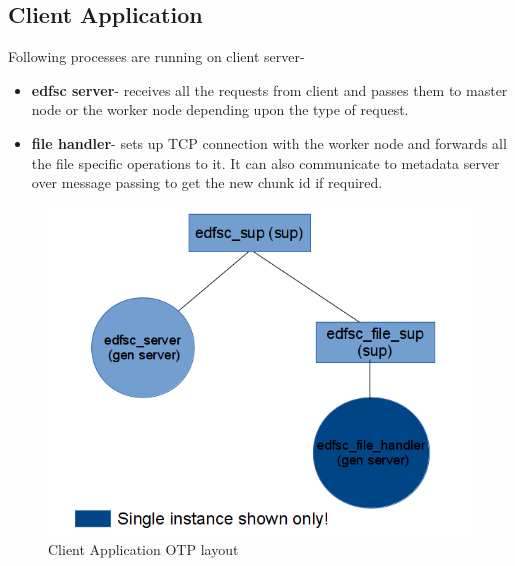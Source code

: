 \documentclass[a4paper,12pt]{article}
\begin{document}
\subsection{Client Application}
Following processes are running on client server-
\begin{itemize}
\item \textbf{edfsc server}- receives all the requests from client and passes them to master node or the worker node depending upon the type of request.
\item \textbf{file handler}- sets up TCP connection with the worker node and forwards all the file specific operations to it. It can also communicate to metadata server over message passing to get the new chunk id if required.
\end{itemize}
\begin{figure}[h]
  \begin{center}
    \includegraphics[scale = 0.5]{images/client_otp_layout}
  \end{center}
  \caption{Client Application OTP layout}
\end{figure}
\end{document}
